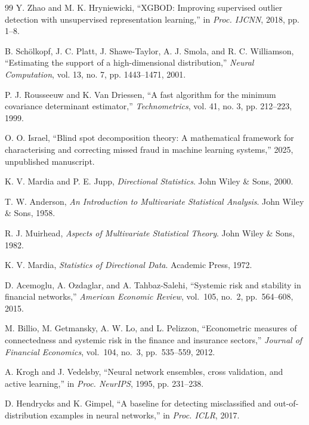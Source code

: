 \documentclass[journal]{IEEEtran}
\begin{document}
\begin{thebibliography}{99}
Y. Zhao and M. K. Hryniewicki, ``XGBOD: Improving supervised outlier detection with unsupervised representation learning,'' in \textit{Proc. IJCNN}, 2018, pp. 1--8.

B. Sch{\"o}lkopf, J. C. Platt, J. Shawe-Taylor, A. J. Smola, and R. C. Williamson, ``Estimating the support of a high-dimensional distribution,'' \textit{Neural Computation}, vol. 13, no. 7, pp. 1443--1471, 2001.

P. J. Rousseeuw and K. Van Driessen, ``A fast algorithm for the minimum covariance determinant estimator,'' \textit{Technometrics}, vol. 41, no. 3, pp. 212--223, 1999.

O. O. Israel, ``Blind spot decomposition theory: A mathematical framework for characterising and correcting missed fraud in machine learning systems,'' 2025, unpublished manuscript.

K. V. Mardia and P. E. Jupp, \textit{Directional Statistics}.
John Wiley \& Sons, 2000.

T. W. Anderson, \textit{An Introduction to Multivariate Statistical Analysis}.
John Wiley \& Sons, 1958.

R. J. Muirhead, \textit{Aspects of Multivariate Statistical Theory}.
John Wiley \& Sons, 1982.

K. V. Mardia, \textit{Statistics of Directional Data}.
Academic Press, 1972.

D. Acemoglu, A. Ozdaglar, and A. Tahbaz-Salehi,
``Systemic risk and stability in financial networks,''
\textit{American Economic Review}, vol.\ 105, no.\ 2, pp.\ 564--608, 2015.

M. Billio, M. Getmansky, A. W. Lo, and L. Pelizzon,
``Econometric measures of connectedness and systemic risk in the finance
and insurance sectors,'' \textit{Journal of Financial Economics},
vol.\ 104, no.\ 3, pp.\ 535--559, 2012.

A. Krogh and J. Vedelsby, ``Neural network ensembles, cross validation, and active learning,'' in \textit{Proc. NeurIPS}, 1995, pp. 231--238.

D. Hendrycks and K. Gimpel, ``A baseline for detecting misclassified and out-of-distribution examples in neural networks,'' in \textit{Proc. ICLR}, 2017.


\end{thebibliography}
\end{document}
